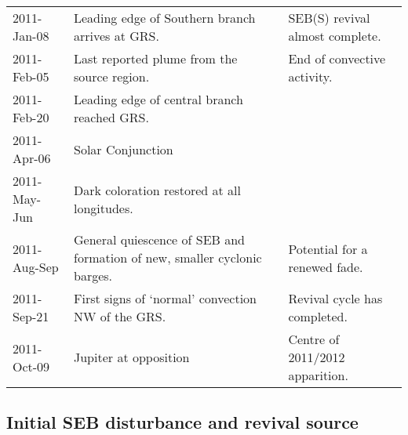 \documentclass[final,authoryear,5p,times,twocolumn]{elsarticle}
\begin{document}
\begin{table*}[htdp]
\begin{center}
\begin{tabular}{|l|p{10cm}|p{5cm}|}
2011-Jan-08 & Leading edge of Southern branch arrives at GRS. & SEB(S) revival almost complete. \\

2011-Feb-05 & Last reported plume from the source region. & End of convective activity. \\

2011-Feb-20 & Leading edge of central branch reached GRS. & \\

2011-Apr-06 & Solar Conjunction & \\

2011-May-Jun & Dark coloration restored at all longitudes. & \\

2011-Aug-Sep & General quiescence of SEB and formation of new, smaller cyclonic barges. & Potential for a renewed fade. \\

2011-Sep-21 & First signs of `normal' convection NW of the GRS. & Revival cycle has completed. \\

2011-Oct-09 & Jupiter at opposition & Centre of 2011/2012 apparition. \\

\hline
\end{tabular}
\end{center}
\label{tab:timeline}
\end{table*}%


\subsection{Initial SEB disturbance and revival source}
\label{seq0}

\end{document}

